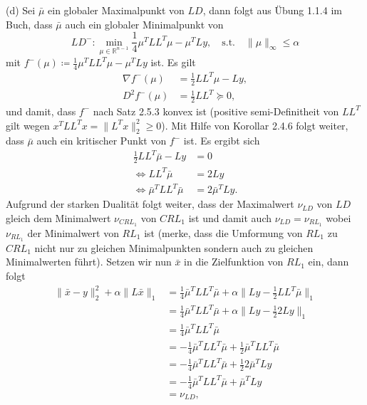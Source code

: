 \documentclass[ngerman, a4paper,12pt]{article}
\begin{document}
\par
(d) Sei $\bar{\mu}$ ein globaler Maximalpunkt von $LD$, dann folgt aus Übung 1.1.4 im Buch, dass $\bar{\mu}$ auch ein globaler Minimalpunkt von
\begin{equation*}
	LD^-: \min_{\mu \in \mathbb{R}^{n-1}} \frac{1}{4}\mu^TLL^T\mu - \mu^TLy, \quad \text{s.t.} \quad \|\mu \|_{\infty}\leq \alpha 
\end{equation*}
mit $f^-(\mu) \coloneqq \frac{1}{4}\mu^TLL^T\mu - \mu^TLy$ ist. Es gilt
\begin{equation*}
	\begin{split}
		\nabla f^-(\mu) &= \frac{1}{2} LL^T\mu - Ly, \\
		D^2f^-(\mu) &= \frac{1}{2} LL^T \succeq 0,
	\end{split}
\end{equation*}
und damit, dass $f^-$ nach Satz 2.5.3 konvex ist (positive semi-Definitheit von $LL^T$ gilt wegen $x^TLL^Tx=\|L^Tx \|_2^2\geq0$). Mit Hilfe von Korollar 2.4.6 folgt weiter, dass $\bar{\mu}$ auch ein kritischer Punkt von $f^-$ ist. Es ergibt sich
\begin{equation}
\label{eq:22d}
	\begin{split}
			\frac{1}{2}LL^T \bar{\mu} - Ly&=0 \\
			\Leftrightarrow LL^T \bar{\mu} &= 2Ly \\
			\Leftrightarrow \bar{\mu}^T LL^T \bar{\mu} &= 2\bar{\mu}^TLy.
	\end{split}
\end{equation}
Aufgrund der starken Dualität folgt weiter, dass der Maximalwert $\nu_{LD}$ von $LD$ gleich dem Minimalwert $\nu_{CRL_1}$ von $CRL_1$ ist und damit auch $\nu_{LD}=\nu_{RL_1}$ wobei $\nu_{RL_1}$ der Minimalwert von $RL_1$ ist (merke, dass die Umformung von $RL_1$ zu $CRL_1$ nicht nur zu gleichen Minimalpunkten sondern auch zu gleichen Minimalwerten führt). Setzen wir nun $\bar{x}$ in die Zielfunktion von $RL_1$ ein, dann folgt
\begin{equation*}
	\begin{split}
		\|\bar{x} - y\|_2^2 + \alpha \| L\bar{x}\|_1 &= \frac{1}{4}\bar{\mu}^TLL^T\bar{\mu} + \alpha \|Ly - \frac{1}{2}LL^T\bar{\mu} \|_1 \\
		&=  \frac{1}{4}\bar{\mu}^TLL^T\bar{\mu} + \alpha \|Ly - \frac{1}{2}2Ly \|_1 \\
		&= \frac{1}{4}\bar{\mu}^TLL^T\bar{\mu} \\
		&= -\frac{1}{4}\bar{\mu}^TLL^T\bar{\mu} + \frac{1}{2}\bar{\mu}^TLL^T\bar{\mu}\\
		&= -\frac{1}{4}\bar{\mu}^TLL^T\bar{\mu} + \frac{1}{2} 2\bar{\mu}^TLy\\
		&= -\frac{1}{4}\bar{\mu}^TLL^T\bar{\mu} + \bar{\mu}^TLy \\
		&= \nu_{LD},
	\end{split}
\end{equation*}
\end{document}
